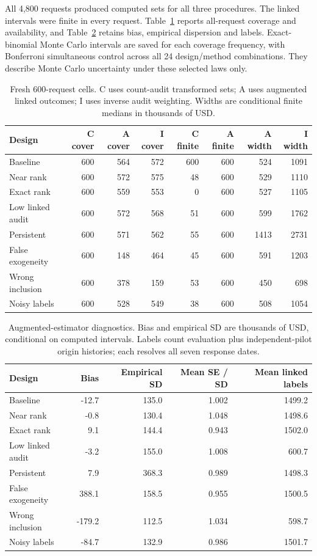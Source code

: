 All 4,800 requests produced computed sets for all three procedures. The
linked intervals were finite in every request. Table~\ref{integrated:linked_funding:tab:coverage}
reports all-request coverage and availability, and
Table~\ref{integrated:linked_funding:tab:diagnostics} retains bias, empirical dispersion and labels.
Exact-binomial Monte Carlo intervals are saved for each coverage frequency,
with Bonferroni simultaneous control across all 24 design/method combinations.
They describe Monte Carlo uncertainty under these selected laws only.

\begin{table}[htbp]\centering\small
\caption{Fresh 600-request cells. C uses count-audit transformed sets; A uses augmented linked outcomes; I uses inverse audit weighting. Widths are conditional finite medians in thousands of USD.}
\begin{tabular}{lrrrrrrr}\toprule
Design & C cover & A cover & I cover & C finite & A finite & A width & I width\\\midrule
Baseline & 600 & 564 & 572 & 600 & 600 & 524 & 1091\\
Near rank & 600 & 572 & 575 & 48 & 600 & 529 & 1110\\
Exact rank & 600 & 559 & 553 & 0 & 600 & 527 & 1105\\
Low linked audit & 600 & 572 & 568 & 51 & 600 & 599 & 1762\\
Persistent & 600 & 571 & 562 & 55 & 600 & 1413 & 2731\\
False exogeneity & 600 & 148 & 464 & 45 & 600 & 591 & 1203\\
Wrong inclusion & 600 & 378 & 159 & 53 & 600 & 450 & 698\\
Noisy labels & 600 & 528 & 549 & 38 & 600 & 508 & 1054\\
\bottomrule\end{tabular}\label{integrated:linked_funding:tab:coverage}\end{table}
\begin{table}[htbp]\centering\small
\caption{Augmented-estimator diagnostics. Bias and empirical SD are thousands of USD, conditional on computed intervals. Labels count evaluation plus independent-pilot origin histories; each resolves all seven response dates.}
\begin{tabular}{lrrrr}\toprule
Design & Bias & Empirical SD & Mean SE / SD & Mean linked labels\\\midrule
Baseline & -12.7 & 135.0 & 1.002 & 1499.2\\
Near rank & -0.8 & 130.4 & 1.048 & 1498.6\\
Exact rank & 9.1 & 144.4 & 0.943 & 1502.0\\
Low linked audit & -3.2 & 155.0 & 1.008 & 600.7\\
Persistent & 7.9 & 368.3 & 0.989 & 1498.3\\
False exogeneity & 388.1 & 158.5 & 0.955 & 1500.5\\
Wrong inclusion & -179.2 & 112.5 & 1.034 & 598.7\\
Noisy labels & -84.7 & 132.9 & 0.986 & 1501.7\\
\bottomrule\end{tabular}\label{integrated:linked_funding:tab:diagnostics}\end{table}

